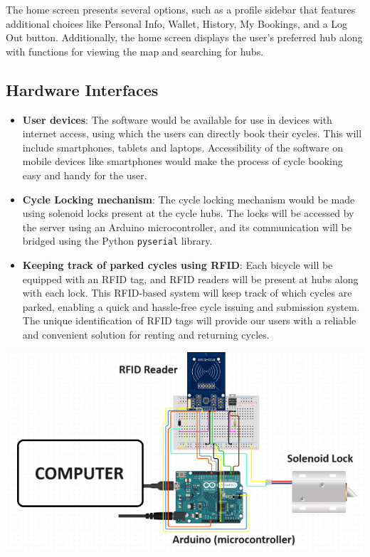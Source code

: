 \documentclass{scrreprt}
\begin{document}
The home screen presents several options, such as a profile sidebar that features additional choices like Personal Info, Wallet, History, My Bookings, and a Log Out button. Additionally, the home screen displays the user's preferred hub along with functions for viewing the map and searching for hubs.
\subsection{Hardware Interfaces}
\begin{itemize}
    \item \textbf{User devices}: The software would be available for use in devices with internet access, using which the users can directly book their cycles. This will include smartphones, tablets and laptops. Accessibility of the software on mobile devices like smartphones would make the process of cycle booking easy and handy for the user.
    \item \textbf{Cycle Locking mechanism}: The cycle locking mechanism would be made using solenoid locks present at the cycle hubs. The locks will be accessed by the server using an Arduino microcontroller, and its communication will be bridged using the Python \texttt{pyserial} library.
    \item \textbf{Keeping track of parked cycles using RFID}: Each bicycle will be equipped with an RFID tag, and RFID readers will be present at hubs along with each lock. This RFID-based system will keep track of which cycles are parked, enabling a quick and hassle-free cycle issuing and submission system. The unique identification of RFID tags will provide our users with a reliable and convenient solution for renting and returning cycles.
\end{itemize}
\begin{center}
    \includegraphics*[scale=0.75]{rfid-img.png}
\end{center}
\end{document}
